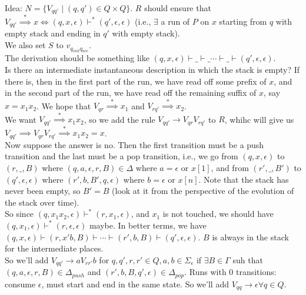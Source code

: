 \documentclass[a4paper]{article}
\newcommand{\nl}{\vspace{0.2cm}\\}
\newcommand{\produces}{\implies}
\newcommand{\derives}{\stackrel{*}{\implies}}
\newcommand{\changesto}{\vdash}
\begin{document}
\begin{note}
    Idea: $N = \{V_{qq'} \mid (q, q') \in Q \times Q\}$. $R$ should ensure that $V_{qq'} \derives x \iff (q, x, \epsilon) \changesto^* (q', \epsilon, \epsilon)$ (i.e., $\exists$ a run of $P$ on $x$ starting from $q$ with empty stack and ending in $q'$
        with empty stack).\nl
        We also set $S$ to $v_{q_{init}q_{acc}}$.\nl
        The derivation should be something like $(q, x, \epsilon) \changesto \_ \changesto \_ \cdots \changesto \_ \changesto (q', \epsilon, \epsilon)$.\nl
        Is there an intermediate instantaneous description in which the stack is empty?
        If there is, then in the first part of the run, we have read off some prefix of $x$, and in the second part of the run, we have read off the remaining suffix of $x$, say $x = x_1 x_2$. We
        hope that $V_{qr} \derives x_1$ and $V_{rq'} \derives x_2$.\nl
        We want $V_{qq'} \derives x_1 x_2$, so we add the rule $V_{qq'} \to V_{qr} V_{rq'}$ to $R$, whihc will give us $V_{qq'} \produces V_{qr} V_{rq'} \derives x_1 x_2 = x$.\nl
        Now suppose the answer is no. Then the first transition must be a push transition and the last must be a pop transition, i.e., we go from $(q, x, \epsilon)$ to $(r, \_, B)$ where
        $(q, a, \epsilon, r, B) \in \Delta$ where $a = \epsilon$ or $x[1]$, and from $(r', \_, B')$ to $(q', \epsilon, \epsilon)$ where $(r', b, B', q
        , \epsilon)$ where $b = \epsilon$ or $x[n]$.
        Note that the stack has never been empty, so $B' = B$ (look at it from the perspective of the evolution of the stack over time).\nl
        So since $(q, x_1x_2, \epsilon) \changesto^* (r, x_1, \epsilon)$, and $x_1$ is not touched, we should have $(q, x_1, \epsilon) \changesto^* (r, \epsilon, \epsilon)$ maybe.
        In better terms, we have $(q, x, \epsilon) \changesto (r, x'b, B) \changesto \cdots \changesto (r', b, B) \changesto (q', \epsilon, \epsilon)$. $B$ is always in the stack for the
        intermediate places.\nl
        So we'll add $V_{qq'} \to aV_{rr'}b$ for $q, q', r, r' \in Q, a, b \in \Sigma_\epsilon$ if $\exists B \in \Gamma$ suh that $(q, a, \epsilon, r, B) \in \Delta_{push}$ and $(r', b, B, q',
        \epsilon) \in \Delta_{pop}$.
        Runs with 0 transitions: consume $\epsilon$, must start and end in the same state.
        So we'll add $V_{qq} \to \epsilon \forall q \in Q$.
\end{note}
\end{document}
